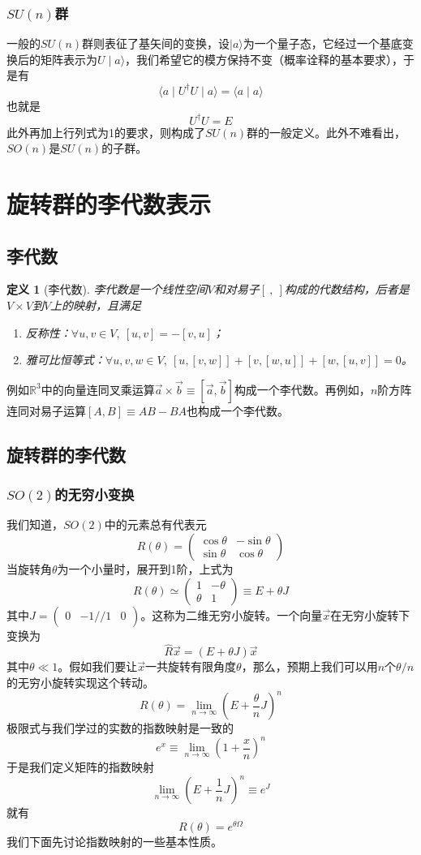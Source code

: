 \documentclass[a4paper,11pt]{ctexart}
\newcommand{\beq}{\begin{equation}}
\newcommand{\eeq}{\end{equation}}
\newcommand{\reals}{\mathbb{R}}
\newtheorem{dfn}{定义}[section]
\begin{document}
\subsubsection{$SU(n)$群}
一般的$SU(n)$群则表征了基矢间的变换，设$\mid a \rangle$为一个量子态，它经过一个基底变换后的矩阵表示为$U \mid a \rangle$，我们希望它的模方保持不变（概率诠释的基本要求），于是有
\beq
\langle a \mid U^\dagger U \mid a \rangle = \langle a \mid a \rangle
\eeq
也就是
\beq
U^\dagger U = E
\eeq
此外再加上行列式为1的要求，则构成了$SU(n)$群的一般定义。此外不难看出，$SO(n)$是$SU(n)$的子群。

\section{旋转群的李代数表示}
\subsection{李代数}
\begin{dfn}[李代数]
李代数是一个线性空间$V$和对易子$[\ ,\ ]$构成的代数结构，后者是$V\times V$到$V$上的映射，且满足
\begin{enumerate}
\item 反称性：$\forall u,v \in V,\ [u,v] = -[v,u]$；
\item 雅可比恒等式：$\forall u,v,w \in V,\ [u,[v,w]] + [v,[w,u]] + [w,[u,v]] = 0$。
\end{enumerate}
\end{dfn}
例如$\reals^3$中的向量连同叉乘运算$\vec{a} \times \vec{b} \equiv [\vec{a},\vec{b}]$构成一个李代数。再例如，$n$阶方阵连同对易子运算$[A,B] \equiv AB - BA$也构成一个李代数。
\subsection{旋转群的李代数}
\subsubsection{$SO(2)$的无穷小变换}
我们知道，$SO(2)$中的元素总有代表元
\beq
R(\theta) = \begin{pmatrix}
\cos \theta & - \sin \theta \\
\sin \theta & \cos \theta
\end{pmatrix}
\eeq
当旋转角$\theta$为一个小量时，展开到1阶，上式为
\beq
R(\theta) \simeq \begin{pmatrix}
1 & - \theta \\
\theta & 1
\end{pmatrix}
\equiv E+ \theta J
\eeq
其中$J = \begin{pmatrix} 0 & - 1// 1 & 0 \end{pmatrix}$。这称为二维无穷小旋转。一个向量$\vec{x}$在无穷小旋转下变换为
\beq
\hat{R} \vec{x} = (E + \theta J) \vec{x}
\eeq
其中$\theta \ll 1$。假如我们要让$\vec{x}$一共旋转有限角度$\theta$，那么，预期上我们可以用$n$个$\theta /n$的无穷小旋转实现这个转动。
\beq
R(\theta) = \lim_{n \to \infty} (E + \frac{\theta}{n} J)^n
\eeq
极限式与我们学过的实数的指数映射是一致的
\beq
e^x \equiv \lim_{n \to \infty} (1 + \frac{x}{n})^n
\eeq
于是我们定义矩阵的指数映射
\beq
\lim_{n \to \infty} (E + \frac{1}{n} J)^n \equiv e^{ J}
\eeq
就有
\beq
R(\theta) = e^{\theta \varOmega}
\eeq
我们下面先讨论指数映射的一些基本性质。
\end{document}

